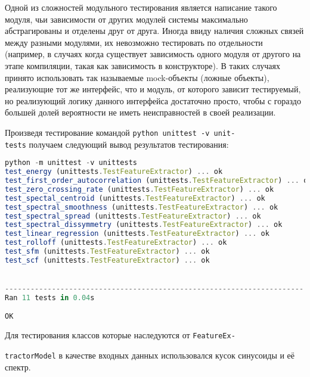 Одной из сложностей модульного тестирования является написание такого модуля, чьи зависимости от других модулей системы максимально абстрагированы и отделены друг от друга. Иногда ввиду наличия сложных связей между разными модулями, их невозможно тестировать по отдельности (например, в случаях когда существует зависимость одного модуля от другого на этапе компиляции, такая как зависимость в конструкторе). В таких случаях принято использовать так называемые mock-объекты (ложные объекты), реализующие тот же интерфейс, что и модуль, от которого зависит тестируемый, но реализующий логику данного интерфейса достаточно просто, чтобы с гораздо большей долей вероятности не иметь неисправностей в своей реализации.

Произведя тестирование командой \texttt{python unittest -v unit-} \\ \texttt{tests} получаем следующий вывод результатов тестирования:
\begin{lstlisting}[language=TypeScript, label=lst:testing:results]
python -m unittest -v unittests
test_energy (unittests.TestFeatureExtractor) ... ok
test_first_order_autocorrelation (unittests.TestFeatureExtractor) ... ok
test_zero_crossing_rate (unittests.TestFeatureExtractor) ... ok
test_spectal_centroid (unittests.TestFeatureExtractor) ... ok
test_spectral_smoothness (unittests.TestFeatureExtractor) ... ok
test_spectral_spread (unittests.TestFeatureExtractor) ... ok
test_spectral_dissymmetry (unittests.TestFeatureExtractor) ... ok
test_linear_regression (unittests.TestFeatureExtractor) ... ok
test_rolloff (unittests.TestFeatureExtractor) ... ok
test_sfm (unittests.TestFeatureExtractor) ... ok
test_scf (unittests.TestFeatureExtractor) ... ok


----------------------------------------------------------------------
Ran 11 tests in 0.04s

OK
\end{lstlisting}

Для тестирования классов которые наследуются от \texttt{FeatureEx-}

 \texttt{tractorModel} в качестве входных данных использовался кусок синусоиды и её спектр.

